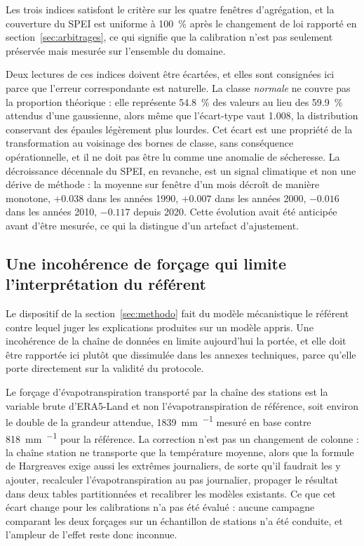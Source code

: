 Les trois indices satisfont le critère sur les quatre fenêtres d'agrégation, et la couverture du SPEI est uniforme à \SI{100}{\percent} après le changement de loi rapporté en section~\ref{sec:arbitrages}, ce qui signifie que la calibration n'est pas seulement préservée mais mesurée sur l'ensemble du domaine.

Deux lectures de ces indices doivent être écartées, et elles sont consignées ici parce que l'erreur correspondante est naturelle. La classe \emph{normale} ne couvre pas la proportion théorique : elle représente \SI{54,8}{\percent} des valeurs au lieu des \SI{59,9}{\percent} attendus d'une gaussienne, alors même que l'écart-type vaut \num{1,008}, la distribution conservant des épaules légèrement plus lourdes. Cet écart est une propriété de la transformation au voisinage des bornes de classe, sans conséquence opérationnelle, et il ne doit pas être lu comme une anomalie de sécheresse. La décroissance décennale du SPEI, en revanche, est un signal climatique et non une dérive de méthode : la moyenne sur fenêtre d'un mois décroît de manière monotone, $+\num{0,038}$ dans les années 1990, $+\num{0,007}$ dans les années 2000, $-\num{0,016}$ dans les années 2010, $-\num{0,117}$ depuis 2020. Cette évolution avait été anticipée avant d'être mesurée, ce qui la distingue d'un artefact d'ajustement.

\subsection{Une incohérence de forçage qui limite l'interprétation du référent}

Le dispositif de la section~\ref{sec:methodo} fait du modèle mécanistique le référent contre lequel juger les explications produites sur un modèle appris. Une incohérence de la chaîne de données en limite aujourd'hui la portée, et elle doit être rapportée ici plutôt que dissimulée dans les annexes techniques, parce qu'elle porte directement sur la validité du protocole.

Le forçage d'évapotranspiration transporté par la chaîne des stations est la variable brute d'ERA5-Land et non l'évapotranspiration de référence, soit environ le double de la grandeur attendue, \SI{1839}{\milli\metre\per\an} mesuré en base contre \SI{818}{\milli\metre\per\an} pour la référence. La correction n'est pas un changement de colonne : la chaîne station ne transporte que la température moyenne, alors que la formule de Hargreaves exige aussi les extrêmes journaliers, de sorte qu'il faudrait les y ajouter, recalculer l'évapotranspiration au pas journalier, propager le résultat dans deux tables partitionnées et recalibrer les modèles existants. Ce que cet écart change pour les calibrations n'a pas été évalué : aucune campagne comparant les deux forçages sur un échantillon de stations n'a été conduite, et l'ampleur de l'effet reste donc inconnue.

